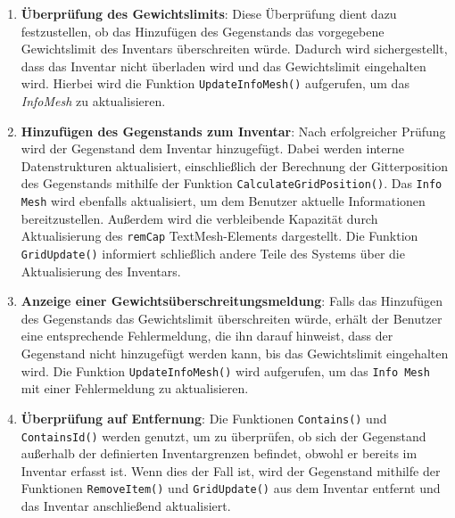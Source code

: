 \begin{enumerate}
    \item \textbf{Überprüfung des Gewichtslimits}:
    Diese Überprüfung dient dazu festzustellen, ob das Hinzufügen des Gegenstands das vorgegebene Gewichtslimit des
    Inventars überschreiten würde. Dadurch wird sichergestellt, dass das Inventar nicht überladen wird und das Gewichtslimit
    eingehalten wird. Hierbei wird die Funktion \texttt{UpdateInfoMesh()} aufgerufen, um das \textit{InfoMesh} zu aktualisieren.

    \item \textbf{Hinzufügen des Gegenstands zum Inventar}:
    Nach erfolgreicher Prüfung wird der Gegenstand dem Inventar hinzugefügt. Dabei werden interne Datenstrukturen aktualisiert,
    einschließlich der Berechnung der Gitterposition des Gegenstands mithilfe der Funktion \texttt{CalculateGridPosition()}.
    Das \texttt{Info Mesh} wird ebenfalls aktualisiert, um dem Benutzer aktuelle Informationen bereitzustellen. Außerdem
    wird die verbleibende Kapazität durch Aktualisierung des \texttt{remCap} TextMesh-Elements dargestellt. Die Funktion
    \texttt{GridUpdate()} informiert schließlich andere Teile des Systems über die Aktualisierung des Inventars.

    \item \textbf{Anzeige einer Gewichtsüberschreitungsmeldung}:
    Falls das Hinzufügen des Gegenstands das Gewichtslimit überschreiten würde, erhält der Benutzer eine entsprechende
    Fehlermeldung, die ihn darauf hinweist, dass der Gegenstand nicht hinzugefügt werden kann, bis das Gewichtslimit
    eingehalten wird. Die Funktion \texttt{UpdateInfoMesh()} wird aufgerufen, um das \texttt{Info Mesh} mit einer Fehlermeldung
    zu aktualisieren.

    \item \textbf{Überprüfung auf Entfernung}:
    Die Funktionen \texttt{Contains()} und \texttt{ContainsId()} werden genutzt, um zu überprüfen, ob sich der Gegenstand
    außerhalb der definierten Inventargrenzen befindet, obwohl er bereits im Inventar erfasst ist. Wenn dies der Fall ist,
    wird der Gegenstand mithilfe der Funktionen \texttt{RemoveItem()} und \texttt{GridUpdate()} aus dem Inventar entfernt
    und das Inventar anschließend aktualisiert.
\end{enumerate}

